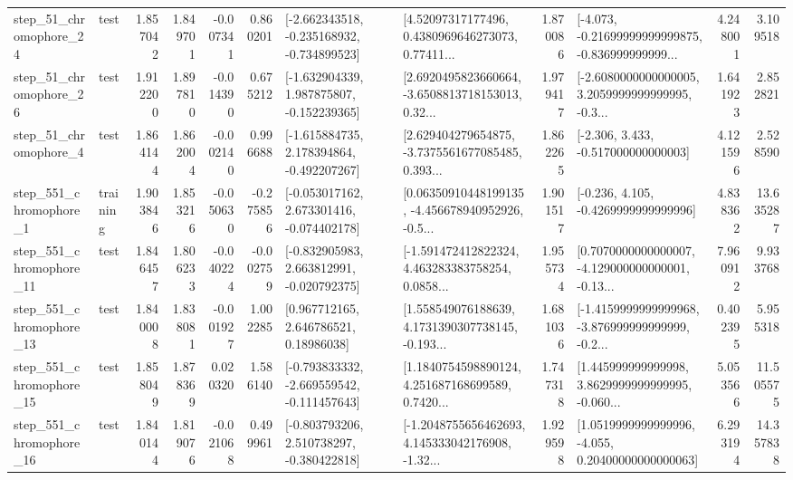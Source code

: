 \begin{tabular}{llrrrrllrlrr}
   step\_51\_chromophore\_24 &      test &      1.857042 &    1.849701 &     -0.007341 &  0.860201 &  [-2.662343518, -0.235168932, -0.734899523] &  [4.52097317177496, 0.4380969646273073, 0.77411... &       1.870086 &  [-4.073, -0.21699999999999875, -0.836999999999... &            4.248001 &          3.109518 \\
   step\_51\_chromophore\_26 &      test &      1.912200 &    1.897810 &     -0.014390 &  0.675212 &   [-1.632904339, 1.987875807, -0.152239365] &  [2.6920495823660664, -3.6508813718153013, 0.32... &       1.979417 &  [-2.6080000000000005, 3.2059999999999995, -0.3... &            1.641923 &          2.852821 \\
    step\_51\_chromophore\_4 &      test &      1.864144 &    1.862004 &     -0.002140 &  0.996688 &   [-1.615884735, 2.178394864, -0.492207267] &  [2.629404279654875, -3.7375561677085485, 0.393... &       1.862265 &                [-2.306, 3.433, -0.517000000000003] &            4.121596 &          2.528590 \\
   step\_551\_chromophore\_1 &  training &      1.903846 &    1.853216 &     -0.050630 & -0.275856 &   [-0.053017162, 2.673301416, -0.074402178] &  [0.06350910448199135, -4.456678940952926, -0.5... &       1.901517 &               [-0.236, 4.105, -0.4269999999999996] &            4.838362 &         13.635287 \\
  step\_551\_chromophore\_11 &      test &      1.846457 &    1.806233 &     -0.040224 & -0.002759 &   [-0.832905983, 2.663812991, -0.020792375] &  [-1.591472412822324, 4.463283383758254, 0.0858... &       1.955734 &  [0.7070000000000007, -4.129000000000001, -0.13... &            7.960912 &          9.933768 \\
  step\_551\_chromophore\_13 &      test &      1.840008 &    1.838081 &     -0.001927 &  1.002285 &      [0.967712165, 2.646786521, 0.18986038] &  [1.558549076188639, 4.1731390307738145, -0.193... &       1.681036 &  [-1.4159999999999968, -3.876999999999999, -0.2... &            0.402395 &          5.955318 \\
  step\_551\_chromophore\_15 &      test &      1.858049 &    1.878369 &      0.020320 &  1.586140 &  [-0.793833332, -2.669559542, -0.111457643] &  [1.1840754598890124, 4.251687168699589, 0.7420... &       1.747318 &  [1.445999999999998, 3.8629999999999995, -0.060... &            5.053566 &         11.505575 \\
  step\_551\_chromophore\_16 &      test &      1.840144 &    1.819076 &     -0.021068 &  0.499961 &   [-0.803793206, 2.510738297, -0.380422818] &  [-1.2048755656462693, 4.145333042176908, -1.32... &       1.929598 &  [1.0519999999999996, -4.055, 0.20400000000000063] &            6.293194 &         14.357838 \\

\end{tabular}
